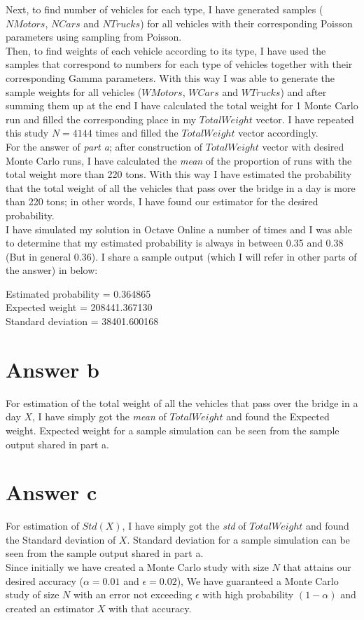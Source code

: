 \documentclass[12pt]{article}
\begin{document}
Next, to find number of vehicles for each type, I have generated samples ($NMotors$, $NCars$ and $NTrucks$) for all vehicles with their corresponding Poisson parameters using sampling from Poisson. \\

Then, to find weights of each vehicle according to its type, I have used the samples that correspond to numbers for each type of vehicles together with their corresponding Gamma parameters. With this way I was able to generate the sample weights for all vehicles ($WMotors$, $WCars$ and $WTrucks$) and after summing them up at the end I have calculated the total weight for 1 Monte Carlo run and filled the corresponding place in my $TotalWeight$ vector. I have repeated this study $N=4144$ times and filled the $TotalWeight$ vector accordingly. \\

For the answer of \textit{part a}; after construction of $TotalWeight$ vector with desired Monte Carlo runs, I have calculated the \textit{mean} of the proportion of runs with the total weight more than 220 tons. With this way I have estimated the probability that the total weight of all the vehicles that pass over the bridge in a day is more than 220 tons; in other words, I have found our estimator for the desired probability. \\

I have simulated my solution in Octave Online a number of times and I was able to determine that my estimated probability is always in between 0.35 and 0.38 (But in general 0.36). I share a sample output (which I will refer in other parts of the answer) in below:

\begin{center}
Estimated probability = 0.364865 \\
Expected weight = 208441.367130 \\
Standard deviation = 38401.600168 
\end{center}

\section*{Answer b}
For estimation of the total weight of all the vehicles that pass over the bridge in a day $X$, I have simply got the \textit{mean} of $TotalWeight$ and found the Expected weight. Expected weight for a sample simulation can be seen from the sample output shared in part a.

\section*{Answer c}
For estimation of $Std(X)$, I have simply got the \textit{std} of $TotalWeight$ and found the Standard deviation of $X$. Standard deviation for a sample simulation can be seen from the sample output shared in part a.\\

Since initially we have created a Monte Carlo study with size $N$ that attains our desired accuracy ($\alpha = 0.01$ and $\epsilon = 0.02$), We have guaranteed a Monte Carlo study of size $N$ with an error not exceeding $\epsilon$ with high probability $(1-\alpha)$ and created an estimator $X$ with that accuracy.
\end{document}

